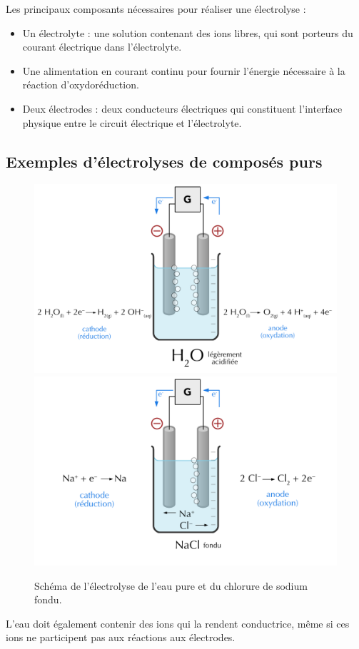 \documentclass[
  11pt,
  a4paper,
  openany]{book}
\providecommand{\tightlist}{%
  \setlength{\itemsep}{0pt}\setlength{\parskip}{0pt}}
\begin{document}
Les principaux composants nécessaires pour réaliser une électrolyse :

\begin{itemize}
\tightlist
\item
  Un électrolyte : une solution contenant des ions libres, qui sont porteurs du courant électrique dans l'électrolyte.
\item
  Une alimentation en courant continu pour fournir l'énergie nécessaire à la réaction d'oxydoréduction.
\item
  Deux électrodes : deux conducteurs électriques qui constituent l'interface physique entre le circuit électrique et l'électrolyte.
\end{itemize}

\clearpage

\hypertarget{exemples-duxe9lectrolyses-de-composuxe9s-purs}{%
\subsection{Exemples d'électrolyses de composés purs}\label{exemples-duxe9lectrolyses-de-composuxe9s-purs}}

\begin{figure}

{\centering \includegraphics[width=0.49\linewidth]{images/electrolysis-water} \includegraphics[width=0.49\linewidth]{images/electrolysis-NaCl} 

}

\caption{Schéma de l'électrolyse de l'eau pure et du chlorure de sodium fondu.}\label{fig:electrolysis-water-NaCl}
\end{figure}

L'eau doit également contenir des ions qui la rendent conductrice, même si ces ions ne participent pas aux réactions aux électrodes.
\end{document}
